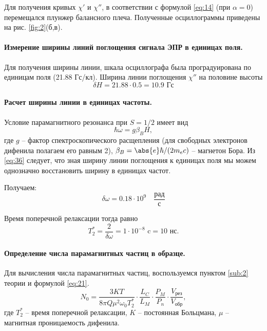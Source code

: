 Для получения кривых $\chi'$ и $\chi''$, в соответствии с формулой \eqref{eq:14} (при $\alpha = 0$) перемещался плунжер балансного плеча. Полученные осциллограммы
приведены на рис. \ref{fig:2}(б,в).

\paragraph{Измерение ширины линий поглощения сигнала ЭПР в единицах поля.}%
Для получения ширины линии, шкала осциллографа была проградуирована по единицам поля (21.88
Гс/кл). Ширина линии поглощения $\chi''$ на половине высоты 
\begin{equation}
    \delta H = 21.88 \cdot 0.5 = 10.9 \text{ Гс}
    \label{eq:}
\end{equation}

\paragraph{Расчет ширины линии в единицах частоты.}
Условие парамагнитного резонанса при $S = 1 / 2$ имеет вид
 \begin{equation}
    \label{eq:36}
    \hbar \omega = g \beta_B H,
\end{equation}
где $g$ -- фактор спектроскопического расщепления (для свободных электронов дифенила полагаем его равным 2),  $\beta_B = \abs{e} \hbar / (2 m_e c)$ -- магнетон Бора.
Из \eqref{eq:36} следует, что зная ширину линии поглощения к единицах поля мы можем однозначно восстановить ширину в единицах частот. 

Получаем:
\begin{equation}
    \label{eq:}
    \delta \omega = 0.18 \cdot 10^{9} \quad \frac{\text{рад}}{\text{с}}
\end{equation}

Время поперечной релаксации тогда равно
\begin{equation}
    \label{eq:}
    T_2^* = \frac{2}{\delta \omega} = 1 \cdot 10^{-8} \text{ c} = 10 \text{ нс.} 
\end{equation}
\paragraph{Определение числа парамагнитных частиц в образце.}%
Для вычисления числа парамагнитных частиц, воспользуемся пунктом \ref{sub:2} теории и формулой \eqref{eq:21}.
\begin{equation}
    \label{eq:21a}
    N_0 = \frac{3KT}{8 \pi Q \mu^2 \omega_0 T^*_2} \cdot \frac{L_C}{L_M} \cdot \frac{P_M}{P_n} \cdot \frac{V_{\text{рез}}}{V_{\text{обр}}},
\end{equation}
где $T_2^*$ -- время поперечной релаксации,  $K$ -- постоянная Больцмана,  $\mu$ -- магнитная проницаемость дифенила.

